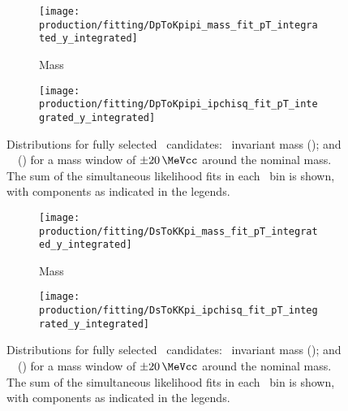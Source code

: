 \begin{figure}
  \begin{subfigure}[b]{0.5\textwidth}
    \centering
    \texttt{[image: production/fitting/DpToKpipi\_mass\_fit\_pT\_integrated\_y\_integrated]}
    \caption{Mass}
    \label{fig:prod:fitting:DpToKpipi:mass}
  \end{subfigure}
  \begin{subfigure}[b]{0.5\textwidth}
    \centering
    \texttt{[image: production/fitting/DpToKpipi\_ipchisq\_fit\_pT\_integrated\_y\_integrated]}
    \caption{\lnipchisq}
    \label{fig:prod:fitting:DpToKpipi:ipchisq}
  \end{subfigure}
  \caption{%
    Distributions for fully selected \DpToKpipi\ candidates: \PDplus\ invariant 
    mass (); and \PDplus\ \lnipchisq\ 
    () for a mass window of 
    $\pm\SI{20}{\MeVcc}$ around the nominal \PDplus mass.
    The sum of the simultaneous likelihood fits in each \pTy\ bin is shown, 
    with components as indicated in the legends.
  }
  \label{fig:prod:fitting:DpToKpipi}
\end{figure}

\begin{figure}
  \begin{subfigure}[b]{0.5\textwidth}
    \centering
    \texttt{[image: production/fitting/DsToKKpi\_mass\_fit\_pT\_integrated\_y\_integrated]}
    \caption{Mass}
    \label{fig:prod:fitting:DsToKKpi:mass}
  \end{subfigure}
  \begin{subfigure}[b]{0.5\textwidth}
    \centering
    \texttt{[image: production/fitting/DsToKKpi\_ipchisq\_fit\_pT\_integrated\_y\_integrated]}
    \caption{\lnipchisq}
    \label{fig:prod:fitting:DsToKKpi:ipchisq}
  \end{subfigure}
  \caption{%
    Distributions for fully selected \DspTophipi\ candidates: \PDsplus\ 
    invariant mass (); and \PDsplus\ 
    \lnipchisq\ () for a mass 
    window of $\pm\SI{20}{\MeVcc}$ around the nominal \PDsplus mass.
    The sum of the simultaneous likelihood fits in each \pTy\ bin is shown, 
    with components as indicated in the legends.
  }
  \label{fig:prod:fitting:DsToKKpi}
\end{figure}

